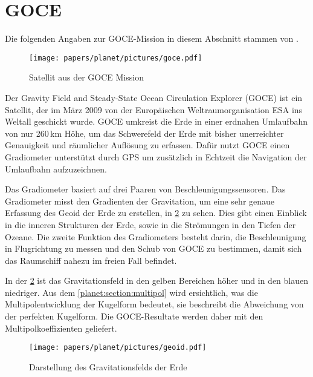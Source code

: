 %
%
%
%
\section{GOCE
\label{planet:section:goce}}

Die folgenden Angaben zur GOCE-Mission in diesem Abschnitt stammen von \cite{planet:goce}.
%
\begin{figure}
    \centering
    \texttt{[image: papers/planet/pictures/goce.pdf]}
    \caption{Satellit aus der GOCE Mission \cite{planet:gocepic}
        \label{planet:fig:goce}}
\end{figure}%

Der Gravity Field and Steady-State Ocean Circulation Explorer (GOCE) ist ein Satellit, der im März 2009 von der Europäischen Weltraumorganisation ESA ins Weltall geschickt wurde.
%
GOCE umkreist die Erde in einer erdnahen Umlaufbahn von nur 260\,km Höhe, um das Schwerefeld der Erde mit bisher unerreichter Genauigkeit und räumlicher Auflösung zu erfassen.
Dafür nutzt GOCE einen Gradiometer unterstützt durch GPS um zusätzlich in Echtzeit die Navigation der Umlaufbahn aufzuzeichnen.
%
%
%

Das Gradiometer basiert auf drei Paaren von Beschleunigungssensoren.
%
Das Gradiometer misst den Gradienten der Gravitation, um eine sehr genaue Erfassung des Geoid der Erde zu erstellen, in \cref{planet:fig:geoid} zu sehen.
%
Dies gibt einen Einblick in die inneren Strukturen der Erde, sowie in die Strömungen in den Tiefen der Ozeane.
%
%
Die zweite Funktion des Gradiometers besteht darin, die Beschleunigung in Flugrichtung zu messen und den Schub von GOCE zu bestimmen, damit sich das Raumschiff nahezu im freien Fall befindet.

In der \cref{planet:fig:geoid} ist das Gravitationsfeld in den gelben Bereichen höher und in den blauen niedriger.
Aus dem \cref{planet:section:multipol} wird ersichtlich, was die Multipolentwicklung der Kugelform bedeutet, sie beschreibt die Abweichung von der perfekten Kugelform.
Die GOCE-Resultate werden daher mit den Multipolkoeffizienten geliefert.

\begin{figure}
    \centering
    \texttt{[image: papers/planet/pictures/geoid.pdf]}
    \caption{Darstellung des Gravitationsfelds der Erde \cite{planet:geoidpic}
        \label{planet:fig:geoid}}
\end{figure}


